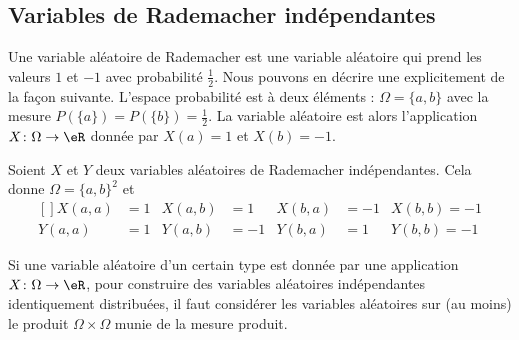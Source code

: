 \subsection{Variables de Rademacher indépendantes}
\label{SUBSECooWOOGooVxflVZ}

Une variable aléatoire de Rademacher est une variable aléatoire qui prend les valeurs \( 1\) et $-1$ avec probabilité \( \frac{ 1 }{2}\). Nous pouvons en décrire une explicitement de la façon suivante. L'espace probabilité est à deux éléments : \( \Omega=\{ a,b \}\) avec la mesure \( P(\{ a \})=P(\{ b \})=\frac{ 1 }{2}\). La variable aléatoire est alors l'application \( X\colon \Omega\to \eR\) donnée par \( X(a)=1\) et \( X(b)=-1\).

Soient \( X\) et \( Y\) deux variables aléatoires de Rademacher indépendantes. Cela donne \( \Omega=\{ a,b \}^2\) et
\begin{equation}
    \begin{aligned}[]
        X(a,a)&=1&X(a,b)&=1&X(b,a)&=-1&X(b,b)=-1\\
        Y(a,a)&=1&Y(a,b)&=-1&Y(b,a)&=1&Y(b,b)=-1
    \end{aligned}
\end{equation}

\begin{remark}
    Si une variable aléatoire d'un certain type est donnée par une application \( X\colon \Omega\to \eR\), pour construire des variables aléatoires indépendantes identiquement distribuées, il faut considérer les variables aléatoires sur (au moins) le produit \( \Omega\times \Omega\) munie de la mesure produit.
\end{remark}

